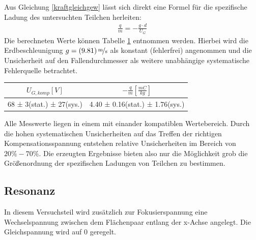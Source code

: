 \documentclass[a4paper,12pt]{article}
\begin{document}
Aus Gleichung \ref{kraftgleichgew} lässt sich direkt eine Formel für die spezifische Ladung des untersuchten Teilchen herleiten:
\begin{align}\label{zspezm}
	\frac{q}{m} = -\frac{g \cdot  d}{U_{G}}
\end{align}
Die berechneten Werte können Tabelle \ref{tab:z-komp-result} entnommen werden. Hierbei wird die Erdbeschleunigung 
$g = \unitfrac[(9.81)]{m}{s}$ als konstant (fehlerfrei) angenommen und die Unsicherheit auf den Fallendurchmesser als weitere
unabhängige systematische Fehlerquelle betrachtet.


\begin{table}[h]
	\centering
	\begin{tabular}{ c | c }
		$U_{G,komp} [V] $ & $-\frac{q}{m}[\frac{mC}{kg}]$ \\
		\hline
		  68 ± 3(stat.) ± 27(sys.) &  4.40 ± 0.16(stat.) ± 1.76(sys.)  \\
	\end{tabular}
	\label{tab:z-komp-result}
\end{table}

Alle Messwerte liegen in einem mit einander kompatiblen Wertebereich. Durch die hohen systematischen Unsicherheiten auf das
Treffen der richtigen Kompensationsspannung entstehen relative Unsicherheiten im Bereich von $20\% - 70 \%$. Die erzeugten
Ergebnisse bieten also nur die Möglichkeit grob die Größenordnung der spezifischen Ladungen von Teilchen zu bestimmen.

\subsection{Resonanz}
In diesem Versuchsteil wird zusätzlich zur Fokusierspannung eine Wechselspannung zwischen dem Flächenpaar entlang der x-Achse angelegt.
Die Gleichspannung wird auf $0$ geregelt.
\end{document}
